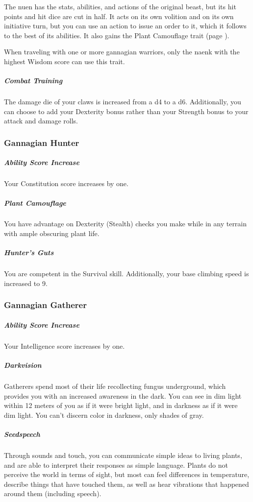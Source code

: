     The nuen has the stats, abilities, and actions of the original beast, but its hit points and hit dice are cut in half.
    It acts on its own volition and on its own initiative turn, but you can use an action to issue an order to it, which it follows to the best of its abilities.
    It also gains the Plant Camouflage trait (page \pageref{trait::plantcamouflage}).

    When traveling with one or more gannagian warriors, only the naenk with the highest Wisdom score can use this trait.

    \subparagraph{Combat Training} The damage die of your claws is increased from a d4 to a d6.
    Additionally, you can choose to add your Dexterity bonus rather than your Strength bonus to your attack and damage rolls.

\subsubsection{Gannagian Hunter}
    \subparagraph{Ability Score Increase} Your Constitution score increases by one.

    \subparagraph{Plant Camouflage} You have advantage on Dexterity (Stealth) checks you make while in any terrain with ample obscuring plant life. \label{trait::plantcamouflage}

    \subparagraph{Hunter's Guts} You are competent in the Survival skill.
    Additionally, your base climbing speed is increased to 9.

\subsubsection{Gannagian Gatherer}
    \subparagraph{Ability Score Increase} Your Intelligence score increases by one.

    \subparagraph{Darkvision} Gatherers spend most of their life recollecting fungus underground, which provides you with an increased awareness in the dark.
    You can see in dim light within 12 meters of you as if it were bright light, and in darkness as if it were dim light.
    You can't discern color in darkness, only shades of gray.

    \subparagraph{Seedspeech} Through sounds and touch, you can communicate simple ideas to living plants, and are able to interpret their responses as simple language.
    Plants do not perceive the world in terms of sight, but most can feel differences in temperature, describe things that have touched them, as well as hear vibrations that happened around them (including speech).

